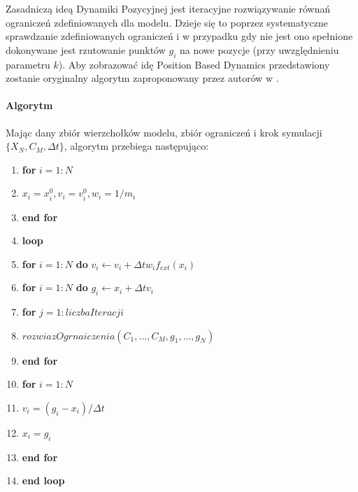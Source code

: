 Zasadniczą ideą Dynamiki Pozycyjnej jest iteracyjne rozwiązywanie
równań ograniczeń zdefiniowanych dla modelu.
Dzieje się to poprzez systematyczne sprawdzanie zdefiniowanych ograniczeń i w
przypadku gdy nie jest ono spełnione dokonywane jest rzutowanie punktów $g_i$ na
nowe pozycje (przy uwzględnieniu parametru $k$). Aby zobrazować idę
Position Based Dynamics przedstawiony zostanie oryginalny algorytm zaproponowany
przez autorów w \cite{pbdyn}.

\paragraph{Algorytm}

Mając dany zbiór wierzchołków modelu, zbiór ograniczeń i krok symulacji $\{X_N,
	C_M, \Delta t \}$, algorytm przebiega następująco:
\begin{enumerate}
\item \textbf{for} $i = 1:N$
\item \hspace{1cm} $x_i = x_i^0, v_i = v_i^0, w_i = 1/m_i$
\item \textbf{end for}
\item \textbf{loop}
\item \hspace{1cm} \textbf{for} $i = 1:N$ \textbf{do} $v_i \leftarrow v_i + \Delta t w_i f_{ext}(x_i)$
\item \hspace{1cm} \textbf{for} $i = 1:N$ \textbf{do} $g_i \leftarrow x_i + \Delta t v_i$
\item \hspace{1cm} \textbf{for} $j = 1:liczbaIteracji$
\item \hspace{2cm} $rozwiazOgrnaiczenia(C_1,..., C_{M}, g_1, ..., g_N)$
\item \hspace{1cm} \textbf{end for}
\item \hspace{1cm} \textbf{for} $i = 1:N$
\item \hspace{2cm} $v_i = (g_i - x_i) / \Delta t$
\item \hspace{2cm} $x_i = g_i$
\item \hspace{1cm}\textbf{end for}
\item \textbf{end loop}

\end{enumerate}

